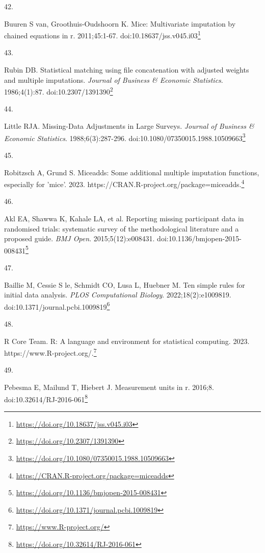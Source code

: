 \documentclass[
  a4paper,
]{book}
\newlength{\cslhangindent}
\newlength{\csllabelwidth}
\newlength{\cslentryspacingunit} %
\newenvironment{CSLReferences}[2] %
 {%
  \setlength{\parindent}{0pt}
  \ifodd #1
  \let\oldpar\par
  \def\par{\hangindent=\cslhangindent\oldpar}
  \fi
  \setlength{\parskip}{#2\cslentryspacingunit}
 }%
 {}
\newcommand{\CSLLeftMargin}[1]{\parbox[t]{\csllabelwidth}{#1}}
\newcommand{\CSLRightInline}[1]{\parbox[t]{\linewidth - \csllabelwidth}{#1}\break}
\renewcommand{\href}[2]{#2\footnote{\url{#1}}}
\begin{document}
\begin{CSLReferences}{0}{0}
\leavevmode{}%
\CSLLeftMargin{42. }%
\CSLRightInline{Buuren S van, Groothuis-Oudshoorn K. {\textbraceleft}Mice{\textbraceright}: Multivariate imputation by chained equations in r. 2011;45:1-67. doi:\href{https://doi.org/10.18637/jss.v045.i03}{10.18637/jss.v045.i03}}

\leavevmode{}%
\CSLLeftMargin{43. }%
\CSLRightInline{Rubin DB. Statistical matching using file concatenation with adjusted weights and multiple imputations. \emph{Journal of Business \& Economic Statistics}. 1986;4(1):87. doi:\href{https://doi.org/10.2307/1391390}{10.2307/1391390}}

\leavevmode{}%
\CSLLeftMargin{44. }%
\CSLRightInline{Little RJA. Missing-Data Adjustments in Large Surveys. \emph{Journal of Business \& Economic Statistics}. 1988;6(3):287-296. doi:\href{https://doi.org/10.1080/07350015.1988.10509663}{10.1080/07350015.1988.10509663}}

\leavevmode{}%
\CSLLeftMargin{45. }%
\CSLRightInline{Robitzsch A, Grund S. Miceadds: Some additional multiple imputation functions, especially for 'mice'. 2023. \href{https://CRAN.R-project.org/package=miceadds}{https://CRAN.R-project.org/package=miceadds.}}

\leavevmode{}%
\CSLLeftMargin{46. }%
\CSLRightInline{Akl EA, Shawwa K, Kahale LA, et al. Reporting missing participant data in randomised trials: systematic survey of the methodological literature and a proposed guide. \emph{BMJ Open}. 2015;5(12):e008431. doi:\href{https://doi.org/10.1136/bmjopen-2015-008431}{10.1136/bmjopen-2015-008431}}

\leavevmode{}%
\CSLLeftMargin{47. }%
\CSLRightInline{Baillie M, Cessie S le, Schmidt CO, Lusa L, Huebner M. Ten simple rules for initial data analysis. \emph{PLOS Computational Biology}. 2022;18(2):e1009819. doi:\href{https://doi.org/10.1371/journal.pcbi.1009819}{10.1371/journal.pcbi.1009819}}

\leavevmode{}%
\CSLLeftMargin{48. }%
\CSLRightInline{R Core Team. R: A language and environment for statistical computing. 2023. \href{https://www.R-project.org/}{https://www.R-project.org/.}}

\leavevmode{}%
\CSLLeftMargin{49. }%
\CSLRightInline{Pebesma E, Mailund T, Hiebert J. Measurement units in {\textbraceleft}r{\textbraceright}. 2016;8. doi:\href{https://doi.org/10.32614/RJ-2016-061}{10.32614/RJ-2016-061}}


\end{CSLReferences}
\end{document}
